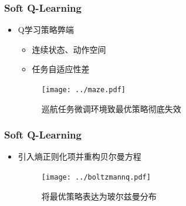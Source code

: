 \documentclass{beamer}
\begin{document}
\begin{CJK*}{GBK}{hei}
\begin{frame}\frametitle{Soft Q-Learning}
\begin{itemize}
\item Q学习策略弊端
{
\begin{itemize}
\item 连续状态、动作空间
\item 任务自适应性差
\end{itemize}
}
        \begin{figure}[htbp]
            \centering\texttt{[image: ../maze.pdf]}
	    \caption{巡航任务微调环境致最优策略彻底失效\citep{Haarnoja2017ReinforcementLW}}
        \end{figure}
\end{itemize}
\end{frame}

\begin{frame}\frametitle{Soft Q-Learning}
\begin{itemize}
\item 引入熵正则化项并重构贝尔曼方程
        \begin{figure}[htbp]
            \centering\texttt{[image: ../boltzmannq.pdf]}
	    \caption{将最优策略表达为玻尔兹曼分布}
        \end{figure}
\end{itemize}

\end{frame}


\end{CJK*}
\end{document}
